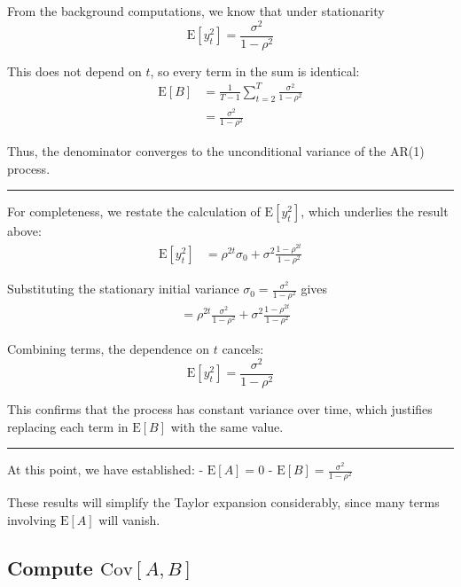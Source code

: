 \documentclass[11pt]{article}
\begin{document}
From the background computations, we know that under stationarity \[
\text{E}\left[y_{t}^2\right] = \frac{\sigma^2}{1-\rho^{2}}
\]

This does not depend on \(t\), so every term in the sum is identical: \[
\begin{aligned}
\text{E}\left[B\right]
&=\frac{1}{T-1}\sum_{t=2}^{T} \frac{\sigma^2}{1-\rho^{2}}\\
&=\frac{\sigma^2}{1-\rho^{2}}
\end{aligned}
\]

Thus, the denominator converges to the unconditional variance of the
AR(1) process.

\begin{center}\rule{0.5\linewidth}{0.5pt}\end{center}

For completeness, we restate the calculation of \(\text{E}[y_t^2]\),
which underlies the result above: \[
\begin{aligned}
\text{E}\left[y_{t}^2\right]
&=\rho^{2t} \sigma_0+\sigma^2\frac{1-\rho^{2t}}{1-\rho^{2}}
\end{aligned}
\]

Substituting the stationary initial variance
\(\sigma_0 = \frac{\sigma^2}{1-\rho^2}\) gives \[
\begin{aligned}
&=\rho^{2t} \frac{\sigma^2}{1-\rho^{2}}+\sigma^2\frac{1-\rho^{2t}}{1-\rho^{2}}
\end{aligned}
\]

Combining terms, the dependence on \(t\) cancels: \[
\text{E}\left[y_{t}^2\right]
=\frac{\sigma^2}{1-\rho^{2}}
\]

This confirms that the process has constant variance over time, which
justifies replacing each term in \(\text{E}[B]\) with the same value.

\begin{center}\rule{0.5\linewidth}{0.5pt}\end{center}

At this point, we have established: - \(\text{E}[A] = 0\) -
\(\text{E}[B] = \frac{\sigma^2}{1-\rho^2}\)

These results will simplify the Taylor expansion considerably, since
many terms involving \(\text{E}[A]\) will vanish.

    \subsection{\texorpdfstring{Compute
\(\text{Cov}[A,B]\)}{Compute \textbackslash text\{Cov\}{[}A,B{]}}}\label{compute-textcovab}
\end{document}
